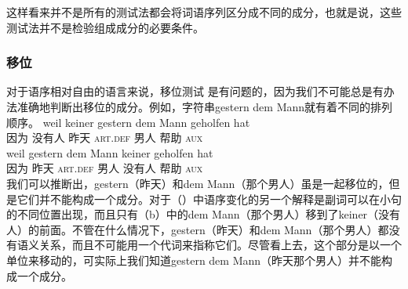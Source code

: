 这样看来并不是所有的测试法都会将词语序列区分成不同的成分，也就是说，这些测试法并不是检验组成成分的必要条件。

\subsubsection{移位}
对于语序相对自由的语言来说，移位测试 是有问题的，因为我们不可能总是有办法准确地判断出移位的成分。例如，字符串gestern dem Mann就有着不同的排列顺序。
\eal
\ex 
\gll weil keiner gestern dem Mann geholfen hat\\
     因为 没有人 昨天 \textsc{art}.\textsc{def} 男人 帮助 \textsc{aux}\\
\ex 
\gll weil gestern dem Mann keiner geholfen hat\\
	 因为 昨天 \textsc{art}.\textsc{def} 男人 没有人 帮助 \textsc{aux}\\
\zl
我们可以推断出，gestern（昨天）和dem Mann（那个男人）虽是一起移位的，但是它们并不能构成一个成分。对于（）中语序变化的另一个解释是副词可以在小句的不同位置出现，而且只有（b）中的dem Mann（那个男人）移到了keiner（没有人）的前面。不管在什么情况下，gestern（昨天）和dem Mann（那个男人）都没有语义关系，而且不可能用一个代词来指称它们。尽管看上去，这个部分是以一个单位来移动的，可实际上我们知道gestern dem Mann（昨天那个男人）并不能构成一个成分。

